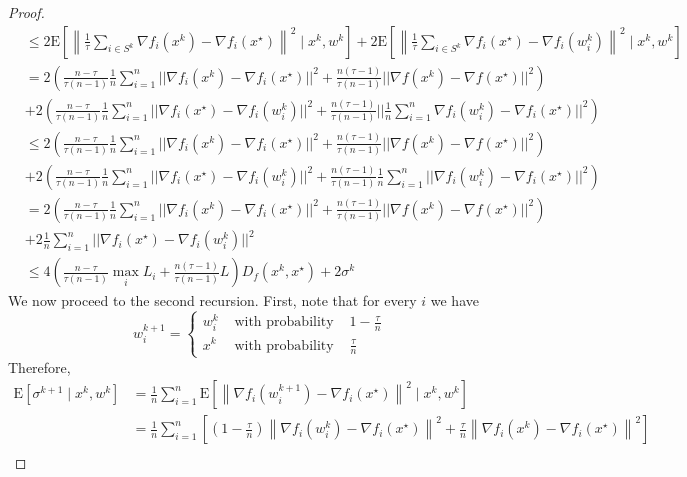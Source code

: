 \documentclass[12pt,a4paper]{article}
\begin{document}
\begin{proof}
\begin{equation}
\begin{aligned}
			&\leq 2 \mathrm{E}\left[\left\|\frac{1}{\tau}\sum_{i\in S^k}\nabla f_{i}\left(x^{k}\right)-\nabla f_{i}\left(x^{\star}\right)\right\|^{2} \mid x^{k}, w^{k}\right] +2 \mathrm{E}\left[\left\|\frac{1}{\tau}\sum_{i\in S^k}\nabla f_{i}\left(x^{\star}\right)-\nabla f_{i}\left(w_{i}^{k}\right)\right\|^{2} \mid x^{k}, w^{k}\right] \\
			&=2 (\frac{n-\tau}{\tau(n-1)}\frac{1}{n}\sum_{i=1}^n||\nabla f_i(x^k)-\nabla f_i(x^{\star})||^2+\frac{n(\tau-1)}{\tau(n-1)}||\nabla f(x^k)-\nabla f(x^{\star})||^2)\\
			&+2 (\frac{n-\tau}{\tau(n-1)}\frac{1}{n}\sum_{i=1}^n||\nabla f_i(x^{\star})-\nabla f_i(w^k_i)||^2+\frac{n(\tau-1)}{\tau(n-1)}||\frac{1}{n}\sum_{i=1}^{n}\nabla f_i(w^k_i)-\nabla f_i(x^{\star})||^2)\\
			&\leq 2 (\frac{n-\tau}{\tau(n-1)}\frac{1}{n}\sum_{i=1}^n||\nabla f_i(x^k)-\nabla f_i(x^{\star})||^2+\frac{n(\tau-1)}{\tau(n-1)}||\nabla f(x^k)-\nabla f(x^{\star})||^2)\\
			&+2 (\frac{n-\tau}{\tau(n-1)}\frac{1}{n}\sum_{i=1}^n||\nabla f_i(x^{\star})-\nabla f_i(w^k_i)||^2+\frac{n(\tau-1)}{\tau(n-1)}\frac{1}{n}\sum_{i=1}^{n}||\nabla f_i(w^k_i)-\nabla f_i(x^{\star})||^2)\\
			&= 2 (\frac{n-\tau}{\tau(n-1)}\frac{1}{n}\sum_{i=1}^n||\nabla f_i(x^k)-\nabla f_i(x^{\star})||^2+\frac{n(\tau-1)}{\tau(n-1)}||\nabla f(x^k)-\nabla f(x^{\star})||^2)\\
			&+2\frac{1}{n} \sum_{i=1}^n||\nabla f_i(x^{\star})-\nabla f_i(w^k_i)||^2\\
			& \leq 4\left(\frac{n-\tau}{\tau(n-1)} \max _{i} L_{i}+\frac{n(\tau-1)}{\tau(n-1)} L\right) D_{f}(x^k, x^{\star})+2\sigma^k
		\end{aligned}
	\end{equation}
We now proceed to the second recursion. First, note that for every $i$ we have
$$
w_{i}^{k+1}=\left\{\begin{array}{lll}
	w_{i}^{k} & \text { with probability } & 1-\frac{\tau}{n} \\
	x^{k} & \text { with probability } & \frac{\tau}{n}
\end{array}\right.
$$
Therefore,
$$
\begin{aligned}
	\mathrm{E}\left[\sigma^{k+1} \mid x^{k}, w^{k}\right] &=\frac{1}{n} \sum_{i=1}^{n} \mathrm{E}\left[\left\|\nabla f_{i}\left(w_{i}^{k+1}\right)-\nabla f_{i}\left(x^{\star}\right)\right\|^{2} \mid x^{k}, w^{k}\right] \\
	& \stackrel{}{=} \frac{1}{n} \sum_{i=1}^{n}\left[\left(1-\frac{\tau}{n}\right)\left\|\nabla f_{i}\left(w_{i}^{k}\right)-\nabla f_{i}\left(x^{\star}\right)\right\|^{2}+\frac{\tau}{n}\left\|\nabla f_{i}\left(x^{k}\right)-\nabla f_{i}\left(x^{\star}\right)\right\|^{2}\right] \\

\end{aligned}$$
\end{proof}
\end{document}
